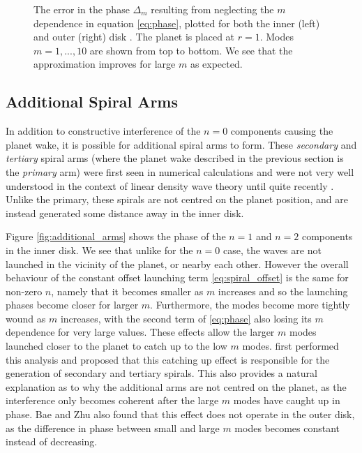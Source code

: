 \begin{figure}
\begin{subfigure}[b]{0.49\textwidth}
        \label{fig:delta_m_outer}
    \end{subfigure}
       \caption{The error in the phase $\Delta_m$ resulting from neglecting the $m$ dependence in equation \ref{eq:phase}, plotted for both the inner (left) and outer (right) disk \citep{ogilvie2002}.
       The planet is placed at $r=1$. Modes $m=1,...,10$ are shown from top to bottom.
       We see that the approximation improves for large $m$ as expected.}
       \label{fig:delta_m}
\end{figure}

\subsection{Additional Spiral Arms}

In addition to constructive interference of the $n=0$ components causing the planet wake, it is possible for additional spiral arms to form.
These \textit{secondary} and \textit{tertiary} spiral arms (where the planet wake described in the previous section is the \textit{primary} arm) were first seen in numerical calculations \citep{fung2015} and were not very well understood in the context of linear density wave theory until quite recently \citep{bae2018a,miranda2019a}.
Unlike the primary, these spirals are not centred on the planet position, and are instead generated some distance away in the inner disk.

Figure \ref{fig:additional_arms} shows the phase of the $n=1$ and $n=2$ components in the inner disk.
We see that unlike for the $n=0$ case, the waves are not launched in the vicinity of the planet, or nearby each other.
However the overall behaviour of the constant offset launching term \ref{eq:spiral_offset} is the same for non-zero $n$, namely that it becomes smaller as $m$ increases and so the launching phases become closer for larger $m$.
Furthermore, the modes become more tightly wound as $m$ increases, with the second term of \ref{eq:phase} also losing its $m$ dependence for very large values.
These effects allow the larger $m$ modes launched closer to the planet to catch up to the low $m$ modes.
\citet{bae2018a} first performed this analysis and proposed that this catching up effect is responsible for the generation of secondary and tertiary spirals.
This also provides a natural explanation as to why the additional arms are not centred on the planet, as the interference only becomes coherent after the large $m$ modes have caught up in phase.
Bae and Zhu also found that this effect does not operate in the outer disk, as the difference in phase between small and large $m$ modes becomes constant instead of decreasing.

